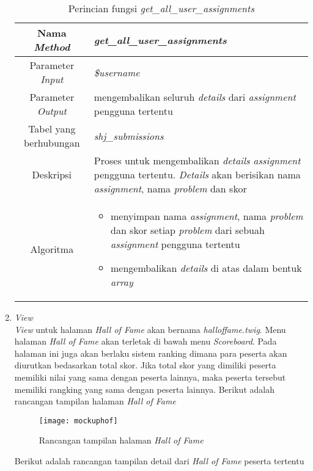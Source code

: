 \begin{enumerate}
	\begin{table}[H]
		\caption{Perincian fungsi \textit{get\_all\_user\_assignments}}
		\begin{tabular}{|c|p{11cm}|}
			\hline
			Nama \textit{Method} 	& 	\textit{get\_all\_user\_assignments} 	\\
			\hline
			Parameter \textit{Input} & \textit{\$username} \\
			\hline
			Parameter \textit{Output} &  mengembalikan seluruh \textit{details} dari \textit{assignment} pengguna tertentu\\
			\hline
			Tabel yang berhubungan & \textit{shj\_submissions} \\
			\hline
			Deskripsi	& Proses untuk mengembalikan \textit{details assignment} pengguna tertentu. \textit{Details} akan berisikan nama \textit{assignment}, nama \textit{problem} dan skor \\
			\hline
			Algoritma	& \begin{itemize}
				\item menyimpan nama \textit{assignment}, nama \textit{problem} dan skor setiap \textit{problem} dari sebuah \textit{assignment} pengguna tertentu
				\item mengembalikan \textit{details} di atas dalam bentuk \textit{array}
			\end{itemize} \\
			\hline
		\end{tabular}
	\end{table}
	
	\item \textit{View} \\
	\textit{View} untuk halaman \textit{Hall of Fame} akan bernama \textit{halloffame.twig}. Menu halaman \textit{Hall of Fame} akan terletak di bawah menu \textit{Scoreboard}. Pada halaman ini juga akan berlaku sistem ranking dimana para peserta akan diurutkan bedasarkan total skor. Jika total skor yang dimiliki peserta memiliki nilai yang sama dengan peserta lainnya, maka peserta tersebut memiliki rangking yang sama dengan peserta lainnya. Berikut adalah rancangan tampilan halaman \textit{Hall of Fame}
	
	\begin{figure}[H]
		\centering  
		\texttt{[image: mockuphof]}  
		\caption[Rancangan tampilan halaman \textit{Hall of Fame}]{Rancangan tampilan halaman \textit{Hall of Fame}} 
		\label{fig:mockuphof} 
	\end{figure}

	Berikut adalah rancangan tampilan detail dari \textit{Hall of Fame} peserta tertentu
	

\end{enumerate}

